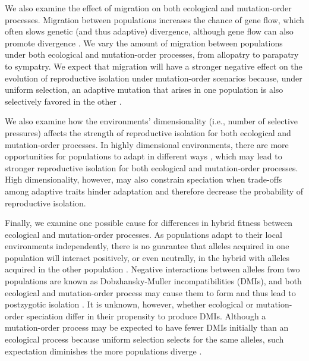 \begin{doublespace}
We also examine the effect of migration
on both ecological and mutation-order processes.
%
Migration between populations increases the chance of gene flow,
which often slows genetic (and thus adaptive) divergence,
although gene flow can also promote divergence \citep{gar06,ras08}.
%
We vary the amount of migration between populations
under both ecological and mutation-order processes,
from allopatry to parapatry to sympatry.
%
We expect that migration will have a stronger negative effect
on the evolution of reproductive isolation under mutation-order scenarios
because, under uniform selection, an adaptive mutation
that arises in one population is also selectively
favored in the other \citep{sch09,nos09b,nos11}.







We also examine how the environments' dimensionality
(i.e., number of selective pressures)
affects the strength of reproductive isolation
for both ecological and mutation-order processes.
%
In highly dimensional environments,
there are more opportunities for populations
to adapt in different ways \citep{ric93,nos09},
which may lead to stronger reproductive isolation
for both ecological and mutation-order processes.
%
High dimensionality, however, may also constrain speciation
when trade-offs among adaptive traits hinder adaptation
and therefore decrease the probability of reproductive isolation.



Finally, we examine one possible cause for differences
in hybrid fitness between ecological and mutation-order processes.
%
As populations adapt to their local environments independently,
there is no guarantee that alleles acquired in one population
will interact positively, or even neutrally, in the hybrid
with alleles acquired in the other population \citep{coy04}.
%
Negative interactions between alleles from two populations
are known as Dob\-zhan\-sky-Mul\-ler incompatibilities (DMIs),
and both ecological and mutation-order process
may cause them to form and thus lead to postzygotic isolation \citep{sch09}.
%
It is unknown, however, whether ecological or mutation-order speciation
differ in their propensity to produce DMIs.
%
Although a mutation-order process may be expected to have
fewer DMIs initially than an ecological process
because uniform selection selects for the same alleles,
such expectation diminishes the more populations diverge \citep{sch09}.




\end{doublespace}
